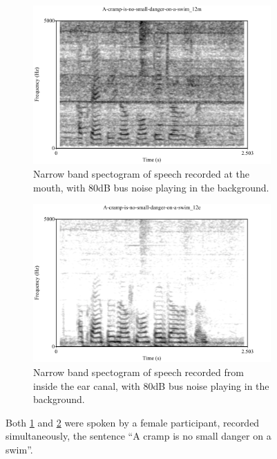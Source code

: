 \documentclass[dissertation,copyright]{uathesis}
\begin{document}
\begin{figure}
\centering
\begin{subfigure}{0.475\textwidth}
  \centering
  \includegraphics[width=1\linewidth]{figure/spctgrmNarrowMthNoise_35.pdf}
  \caption{Narrow band spectogram of speech recorded at the mouth, with 80dB bus noise playing in the background.}
  \label{spctgrmNarrowMouthNoise_35}
\end{subfigure}%
\hfill
\begin{subfigure}{0.475\textwidth}
  \centering
  \includegraphics[width=1\linewidth]{figure/spctgrmNarrowEarNoise_35.pdf}
  \caption{Narrow band spectogram of speech recorded from inside the ear canal, with 80dB bus noise playing in the background.}
  \label{spctgrmNarrowEarNoise_35}
\end{subfigure}
\caption{Both \ref{spctgrmNarrowMouthNoise_35} and \ref{spctgrmNarrowEarNoise_35} were spoken by a female participant, recorded simultaneously, the sentence ``A cramp is no small danger on a swim''.}
\label{fig:noise_mth_ear}
\end{figure}
\end{document}
